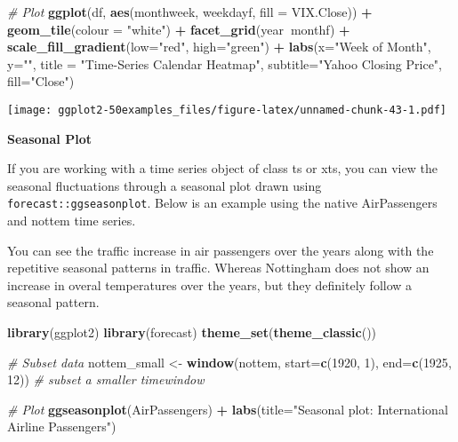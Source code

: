\documentclass[a4paper]{article}
\newenvironment{Shaded}{\begin{snugshade}}{\end{snugshade}}
\newcommand{\KeywordTok}[1]{\textcolor[rgb]{0.13,0.29,0.53}{\textbf{#1}}}
\newcommand{\DataTypeTok}[1]{\textcolor[rgb]{0.13,0.29,0.53}{#1}}
\newcommand{\DecValTok}[1]{\textcolor[rgb]{0.00,0.00,0.81}{#1}}
\newcommand{\StringTok}[1]{\textcolor[rgb]{0.31,0.60,0.02}{#1}}
\newcommand{\CommentTok}[1]{\textcolor[rgb]{0.56,0.35,0.01}{\textit{#1}}}
\newcommand{\OperatorTok}[1]{\textcolor[rgb]{0.81,0.36,0.00}{\textbf{#1}}}
\newcommand{\NormalTok}[1]{#1}
\begin{document}
\begin{Shaded}
\begin{Highlighting}[]
\CommentTok{# Plot}
\KeywordTok{ggplot}\NormalTok{(df, }\KeywordTok{aes}\NormalTok{(monthweek, weekdayf, }\DataTypeTok{fill =}\NormalTok{ VIX.Close)) }\OperatorTok{+}\StringTok{ }
\StringTok{  }\KeywordTok{geom_tile}\NormalTok{(}\DataTypeTok{colour =} \StringTok{"white"}\NormalTok{) }\OperatorTok{+}\StringTok{ }
\StringTok{  }\KeywordTok{facet_grid}\NormalTok{(year}\OperatorTok{~}\NormalTok{monthf) }\OperatorTok{+}\StringTok{ }
\StringTok{  }\KeywordTok{scale_fill_gradient}\NormalTok{(}\DataTypeTok{low=}\StringTok{"red"}\NormalTok{, }\DataTypeTok{high=}\StringTok{"green"}\NormalTok{) }\OperatorTok{+}
\StringTok{  }\KeywordTok{labs}\NormalTok{(}\DataTypeTok{x=}\StringTok{"Week of Month"}\NormalTok{,}
       \DataTypeTok{y=}\StringTok{""}\NormalTok{,}
       \DataTypeTok{title =} \StringTok{"Time-Series Calendar Heatmap"}\NormalTok{, }
       \DataTypeTok{subtitle=}\StringTok{"Yahoo Closing Price"}\NormalTok{, }
       \DataTypeTok{fill=}\StringTok{"Close"}\NormalTok{)}
\end{Highlighting}
\end{Shaded}

\texttt{[image: ggplot2-50examples\_files/figure-latex/unnamed-chunk-43-1.pdf]}

\newpage

\newpage

\textbf{Seasonal Plot}

If you are working with a time series object of class ts or xts, you can
view the seasonal fluctuations through a seasonal plot drawn using
\texttt{forecast::ggseasonplot}. Below is an example using the native
AirPassengers and nottem time series.

You can see the traffic increase in air passengers over the years along
with the repetitive seasonal patterns in traffic. Whereas Nottingham
does not show an increase in overal temperatures over the years, but
they definitely follow a seasonal pattern.

\begin{Shaded}
\begin{Highlighting}[]
\KeywordTok{library}\NormalTok{(ggplot2)}
\KeywordTok{library}\NormalTok{(forecast)}
\KeywordTok{theme_set}\NormalTok{(}\KeywordTok{theme_classic}\NormalTok{())}

\CommentTok{# Subset data}
\NormalTok{nottem_small <-}\StringTok{ }\KeywordTok{window}\NormalTok{(nottem, }\DataTypeTok{start=}\KeywordTok{c}\NormalTok{(}\DecValTok{1920}\NormalTok{, }\DecValTok{1}\NormalTok{), }\DataTypeTok{end=}\KeywordTok{c}\NormalTok{(}\DecValTok{1925}\NormalTok{, }\DecValTok{12}\NormalTok{))  }
\CommentTok{# subset a smaller timewindow}

\CommentTok{# Plot}
\KeywordTok{ggseasonplot}\NormalTok{(AirPassengers) }\OperatorTok{+}\StringTok{ }\KeywordTok{labs}\NormalTok{(}\DataTypeTok{title=}\StringTok{"Seasonal plot: International Airline Passengers"}\NormalTok{)}
\end{Highlighting}
\end{Shaded}
\end{document}

